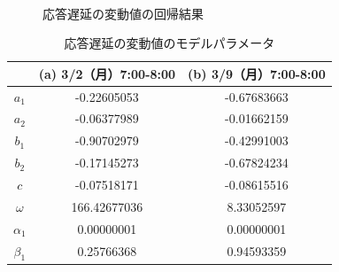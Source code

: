 \documentclass[technicalreport]{ieicej}
\begin{document}
\begin{figure}[tb]
\begin{center}
~
~
\caption{応答遅延の変動値の回帰結果}
\label{diff-reg}
\end{center}
\end{figure}

\begin{table}[tb]
\centering
\caption{応答遅延の変動値のモデルパラメータ}
\label{diff-param}
\begin{tabular}{|c|c|c|}
\hline
&(a) 3/2（月）7:00-8:00&(b) 3/9（月）7:00-8:00\\
\hline
$a_1$&-0.22605053&-0.67683663\\
\hline
$a_2$&-0.06377989&-0.01662159\\
\hline
$b_1$&-0.90702979&-0.42991003\\
\hline
$b_2$&-0.17145273&-0.67824234\\
\hline
$c$&-0.07518171&-0.08615516\\
\hline
$\omega$&166.42677036&8.33052597\\
\hline
$\alpha_1$&0.00000001&0.00000001\\
\hline
$\beta_1$&0.25766368&0.94593359\\
\hline
\end{tabular}
\end{table}
\end{document}
